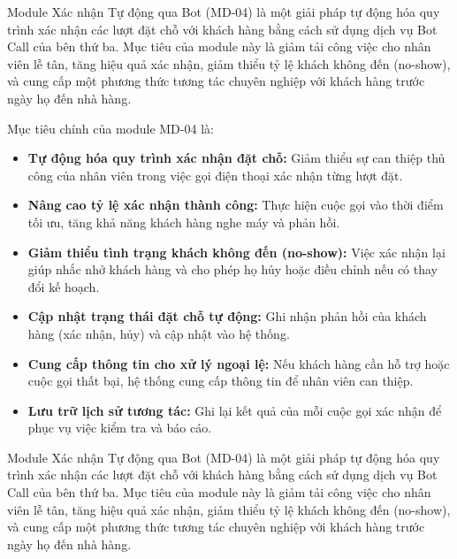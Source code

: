 Module Xác nhận Tự động qua Bot (MD-04) là một giải pháp tự động hóa quy trình xác nhận các lượt đặt chỗ với khách hàng bằng cách sử dụng dịch vụ Bot Call của bên thứ ba. Mục tiêu của module này là giảm tải công việc cho nhân viên lễ tân, tăng hiệu quả xác nhận, giảm thiểu tỷ lệ khách không đến (no-show), và cung cấp một phương thức tương tác chuyên nghiệp với khách hàng trước ngày họ đến nhà hàng.

\label{sssec:md04_objectives_scope}
Mục tiêu chính của module MD-04 là:
\begin{itemize}
    \item \textbf{Tự động hóa quy trình xác nhận đặt chỗ:} Giảm thiểu sự can thiệp thủ công của nhân viên trong việc gọi điện thoại xác nhận từng lượt đặt.
    \item \textbf{Nâng cao tỷ lệ xác nhận thành công:} Thực hiện cuộc gọi vào thời điểm tối ưu, tăng khả năng khách hàng nghe máy và phản hồi.
    \item \textbf{Giảm thiểu tình trạng khách không đến (no-show):} Việc xác nhận lại giúp nhắc nhở khách hàng và cho phép họ hủy hoặc điều chỉnh nếu có thay đổi kế hoạch.
    \item \textbf{Cập nhật trạng thái đặt chỗ tự động:} Ghi nhận phản hồi của khách hàng (xác nhận, hủy) và cập nhật vào hệ thống.
    \item \textbf{Cung cấp thông tin cho xử lý ngoại lệ:} Nếu khách hàng cần hỗ trợ hoặc cuộc gọi thất bại, hệ thống cung cấp thông tin để nhân viên can thiệp.
    \item \textbf{Lưu trữ lịch sử tương tác:} Ghi lại kết quả của mỗi cuộc gọi xác nhận để phục vụ việc kiểm tra và báo cáo.
\end{itemize}
Module Xác nhận Tự động qua Bot (MD-04) là một giải pháp tự động hóa quy trình xác nhận các lượt đặt chỗ với khách hàng bằng cách sử dụng dịch vụ Bot Call của bên thứ ba. Mục tiêu của module này là giảm tải công việc cho nhân viên lễ tân, tăng hiệu quả xác nhận, giảm thiểu tỷ lệ khách không đến (no-show), và cung cấp một phương thức tương tác chuyên nghiệp với khách hàng trước ngày họ đến nhà hàng.

